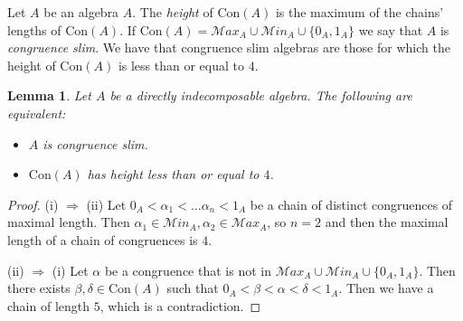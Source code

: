\documentclass[a4paper, english, 9pt]{amsart}
\theoremstyle{plain}
\newtheorem{lemma}[theorem]{Lemma}
\theoremstyle{definition}
\def\con{\mathrm{Con}}
\def\comment#1{{\color{red} #1}}
\def\Ma{\mathcal Max}
\def\ma{\mathcal Min}
\begin{document}
Let $A$ be an algebra $A$. The \emph{height} of $\con(A)$ is the maximum of the chains' lengths of $\con(A)$. If $\con(A)=\Ma_A\cup \ma_A\cup \{0_A,1_A\}$ we say that $A$ is \emph{congruence slim}. We have that congruence slim algebras are those for which the height of $\con(A)$ is less than or equal to $4$.


\begin{lemma}\label{llength 4}
Let $A$ be a directly indecomposable algebra. The following are equivalent: 
\begin{itemize}
    \item[(i)] $A$ is congruence slim. %
    \item[(ii)] $\con(A)$ has height less than or equal to $4$. 
\end{itemize}    
\end{lemma}

\begin{proof}

(i) $\Rightarrow$ (ii) Let $0_A< \alpha_1< \ldots \alpha_n< 1_A$ be a chain of distinct congruences of maximal length. Then $\alpha_1\in \ma_A, \alpha_{2}\in \Ma_A$, so $n=2$ and then the maximal length of a chain of congruences is $4$.

(ii) $\Rightarrow$ (i) Let $\alpha$ be a congruence that is not in $\Ma_A\cup \ma_A\cup \{0_A,1_A\}$. Then there exists $\beta,\delta\in \con(A)$ such that $0_A<\beta<\alpha<\delta<1_A$. Then we have a chain of length $5$, which is a contradiction. %
\end{proof}
\end{document}

